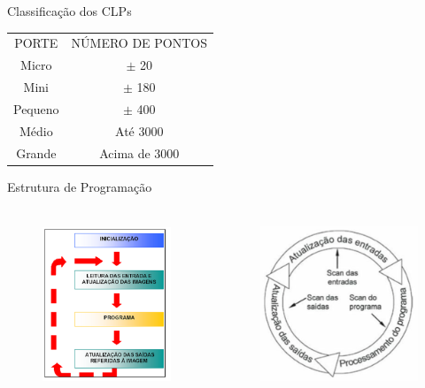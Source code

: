 \documentclass[aspectratio=169,
				xcolor=table]{beamer}
\begin{document}
	\begin{frame}{Classificação dos CLPs}
		\begin{eftable}
			\begin{tabular}{c||c}
			PORTE & NÚMERO DE PONTOS \\ 
			Micro & $\pm$ 20 \\ 
			Mini & $\pm$ 180 \\ 
			Pequeno & $\pm$ 400 \\
			Médio & Até 3000 \\ 
			Grande & Acima de 3000 \\ 
			\end{tabular} 
		
		\end{eftable}
	\end{frame}

	\begin{frame}{Estrutura de Programação}
	
	\begin{columns}
			\begin{column}{0.5\textwidth}
				\begin{figure}[hbtp]
				\centering
				\includegraphics[height=5cm, keepaspectratio]{../figs/cap04/fluxograma.png}
				\end{figure}
			\end{column}
			\begin{column}{0.5\textwidth}
				\begin{figure}[hbtp]
				\centering
				\includegraphics[height=5cm, keepaspectratio]{../figs/cap04/scan.png}
				\end{figure}
			\end{column}
		\end{columns}	
	\end{frame}
\end{document}
